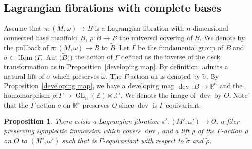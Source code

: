\documentclass[10pt,a4paper]{amsart}
\numberwithin{equation}{section}
\newtheorem{Proposition}[Theorem]{Proposition}
 { \theoremstyle{definition}
\newtheorem{Definition}[Theorem]{Definition}
\newtheorem{Note}[Theorem]{Note}
\newtheorem{Example}[Theorem]{Example}
\newtheorem{Remark}[Theorem]{Remark} }
\newcommand{\R}{\mathbb{R}}
\newcommand{\Z}{\mathbb{Z}}
\renewcommand{\tilde}{\widetilde}
\def\dev{\operatorname{dev}}
\def\Aut{\operatorname{Aut}}
\def\Hom{\operatorname{Hom}}
\def\GL{\operatorname{GL}}
\begin{document}
\subsection{Lagrangian fibrations with complete bases}\label{complete bases}
Assume that $\pi \colon (M,\omega)\to B$ is a Lagrangian fibration with $n$-dimensional connected base mani\-fold~$B$, $p\colon \tilde B\to B$ the universal covering of $B$. We denote by \smash{$\tilde \pi\colon \bigl(\tilde M, \tilde \omega\bigr) \to \tilde B$} the pullback of $\pi\colon (M,\omega)\to B$ to $\tilde B$. Let $\Gamma$ be the fundamental group of $B$ and $\sigma \in \Hom\bigl( \Gamma ,\Aut\bigl(\tilde B\bigr)\bigr)$ the action of $\Gamma$ defined as the inverse of the deck transformation as in Proposition~\ref{developing map}. By definition, \smash{$\tilde M$} admits a natural lift of $\sigma$ which preserves $\tilde \omega$. The $\Gamma$-action on \smash{$\bigl(\tilde M, \tilde \omega\bigr)$} is denoted by $\tilde \sigma$. By Proposition~\ref{developing map}, we have a developing map $\dev\colon \tilde B\to \R^n$ and the homomorphism $\rho\colon \Gamma\to \GL_n(\Z)\ltimes \R^n$. We denote the image of $\dev$ by $O$. Note that the $\Gamma$-action $\rho$ on $\R^n$ preserves $O$ since $\dev$ is $\Gamma$-equivariant.
\begin{Proposition}\label{Lagrangian fibration on simply connected base}
There exists a Lagrangian fibration $\pi'\colon (M',\omega')\to O$, a fiber-preserving symplectic immersion \smash{$\tilde \dev \colon \bigl(\tilde M,\tilde \omega\bigr)\to (M',\omega')$} which covers $\dev$, and a lift $\tilde \rho$ of the $\Gamma$-action $\rho$ on $O$ to $(M',\omega')$ such that \smash{$\tilde \dev$} is $\Gamma$-equivariant with respect to $\tilde \sigma$ and $\tilde \rho$.
\end{Proposition}
\end{document}
